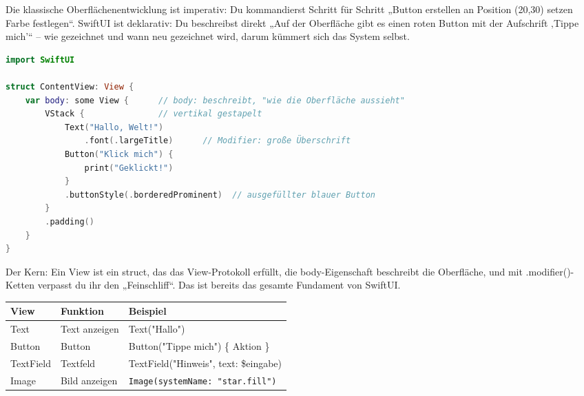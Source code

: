 


Die klassische Oberflächenentwicklung ist imperativ: Du kommandierst Schritt für Schritt „Button erstellen an Position (20,30) setzen Farbe festlegen“. SwiftUI ist deklarativ: Du beschreibst direkt „Auf der Oberfläche gibt es einen roten Button mit der Aufschrift ‚Tippe mich'“ – wie gezeichnet und wann neu gezeichnet wird, darum kümmert sich das System selbst.

\begin{lstlisting}[language=Swift]
import SwiftUI

struct ContentView: View {
    var body: some View {      // body: beschreibt, "wie die Oberfläche aussieht"
        VStack {               // vertikal gestapelt
            Text("Hallo, Welt!")
                .font(.largeTitle)      // Modifier: große Überschrift
            Button("Klick mich") {
                print("Geklickt!")
            }
            .buttonStyle(.borderedProminent)  // ausgefüllter blauer Button
        }
        .padding()
    }
}
\end{lstlisting}

Der Kern: Ein View ist ein struct, das das View-Protokoll erfüllt, die body-Eigenschaft beschreibt die Oberfläche, und mit .modifier()-Ketten verpasst du ihr den „Feinschliff“. Das ist bereits das gesamte Fundament von SwiftUI.


\begin{center}
\begin{tabularx}{\linewidth}{|X|X|X|}
\hline
\textbf{View} & \textbf{Funktion} & \textbf{Beispiel} \tabularnewline
\hline
Text & Text anzeigen & Text("Hallo") \tabularnewline
Button & Button & Button("Tippe mich") \{ Aktion \} \tabularnewline
TextField & Textfeld & TextField("Hinweis", text: \$eingabe) \tabularnewline
Image & Bild anzeigen & \texttt{Image(systemName: "star.\allowbreak fill")} \tabularnewline
\hline
\end{tabularx}
\end{center}


